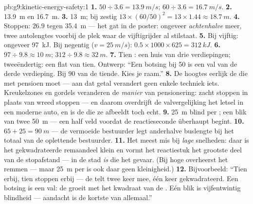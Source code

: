 \begin{solution}{pb:g9:kinetic-energy-safety:1}
\textbf{1.} $50 \div 3.6 = \qty{13.9}{m/s}$; $60 \div 3.6 =
\qty{16.7}{m/s}$.
\textbf{2.} \qty{13.9}{m} en \qty{16.7}{m}.
\textbf{3.} \qty{13}{m}; bij zestig $13 \times (60/50)^2 = 13 \times
1.44 \approx \qty{18.7}{m}$.
\textbf{4.} Stoppen: $26.9$ tegen \qty{35.4}{m} --- het gat in de
poster: ongeveer \emph{achtenhalve } meer, twee
autolengtes voorbij de plek waar de vijftigrijder al stilstaat.
\textbf{5.} Bij vijftig: ongeveer \qty{97}{kJ}. Bij negentig ($v =
\qty{25}{m/s}$): $0.5 \times 1000 \times 625 = \qty{312}{kJ}$.
\textbf{6.} $97 \div 9.8 \approx \qty{10}{m}$; $312 \div 9.8 \approx
\qty{32}{m}$.
\textbf{7.} Tien : een huis van drie verdiepingen;
tweeëndertig: een flat van tien. Ontwerp: ``Een botsing bij 50 is een
val van de derde verdieping. Bij 90 van de tiende. Kies je raam.''
\textbf{8.} De hoogtes  eerlijk de  die
met pensioen moet --- aan dat getal verandert geen enkele techniek iets.
Kreukelzones en gordels veranderen de \emph{manier} van pensionering:
 zacht stoppen in plaats van  wreed
stoppen --- en daarom overdrijft de valvergelijking het letsel in een
moderne auto, en is de  die ze afbeeldt toch echt.
\textbf{9.} \qty{25}{m} blind per ; een blik van twee 
\qty{50}{m} --- een half veld voordat de reactieseconde überhaupt
begint.
\textbf{10.} $65 + 25 = \qty{90}{m}$ --- de vermoeide bestuurder legt
anderhalve buslengte bij het totaal van de oplettende bestuurder.
\textbf{11.} Het meest mis bij \emph{lage} snelheden: daar is het
gekwadrateerde remaandeel klein en vormt het reactiestuk het grootste
deel van de stopafstand --- in de stad \emph{is} die  het gevaar.
(Bij hoge  overheerst het remmen --- maar \qty{25}{m}
per  is ook daar geen kleinigheid.)
\textbf{12.} Bijvoorbeeld: ``Tien  erbij, tien
 stoppen erbij --- de  telt twee keer
mee, één keer gekwadrateerd. Een botsing is een val: de
 groeit met het kwadraat van de
. Eén  blik is vijfentwintig
 blindheid --- aandacht is de kortste
 van allemaal.''
\end{solution}
